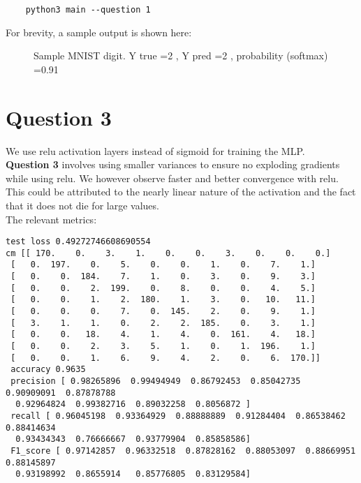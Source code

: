 \begin{lstlisting}
    python3 main --question 1
\end{lstlisting}

For brevity, a sample output is shown here:

\begin{figure}[ht]
\centering
\caption{Sample MNIST digit. Y true =2 , Y pred =2 , probability (softmax) =0.91}
\end{figure}

\section {Question 3 }
\noindent We use relu activation layers instead of sigmoid for training the MLP. \\

\textbf{Question 3} involves using smaller variances to ensure no exploding gradients while using relu.  We however observe faster and better convergence with relu. This could be attributed to the nearly linear nature of the activation and the fact that it does not die for large values.\\

The relevant metrics:

\begin{lstlisting}[numbers=none]
test loss 0.49272746608690554
cm [[ 170.    0.    3.    1.    0.    0.    3.    0.    0.    0.]
 [   0.  197.    0.    5.    0.    0.    1.    0.    7.    1.]
 [   0.    0.  184.    7.    1.    0.    3.    0.    9.    3.]
 [   0.    0.    2.  199.    0.    8.    0.    0.    4.    5.]
 [   0.    0.    1.    2.  180.    1.    3.    0.   10.   11.]
 [   0.    0.    0.    7.    0.  145.    2.    0.    9.    1.]
 [   3.    1.    1.    0.    2.    2.  185.    0.    3.    1.]
 [   0.    0.   18.    4.    1.    4.    0.  161.    4.   18.]
 [   0.    0.    2.    3.    5.    1.    0.    1.  196.    1.]
 [   0.    0.    1.    6.    9.    4.    2.    0.    6.  170.]]
 accuracy 0.9635
 precision [ 0.98265896  0.99494949  0.86792453  0.85042735  0.90909091  0.87878788
  0.92964824  0.99382716  0.89032258  0.8056872 ]
 recall [ 0.96045198  0.93364929  0.88888889  0.91284404  0.86538462  0.88414634
  0.93434343  0.76666667  0.93779904  0.85858586]
 F1_score [ 0.97142857  0.96332518  0.87828162  0.88053097  0.88669951  0.88145897
  0.93198992  0.8655914   0.85776805  0.83129584]
\end{lstlisting}

